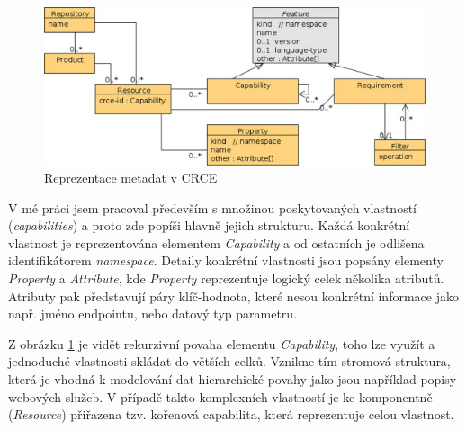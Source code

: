 \documentclass[czech,DP]{thesiskiv}
\begin{document}
 \begin{figure}[h]
 	\centering
 	\includegraphics{resource-uml}
 	\caption{Reprezentace metadat v CRCE}
 	\label{fig:crce-resource-uml}
 \end{figure}

V mé práci jsem pracoval především s množinou poskytovaných vlastností (\textit{capabilities}) a proto zde popíši hlavně jejich strukturu. Každá konkrétní vlastnost je reprezentována elementem \textit{Capability} a od ostatních je odlišena identifikátorem \textit{namespace}. Detaily konkrétní vlastnosti jsou popsány elementy \textit{Property} a \textit{Attribute}, kde \textit{Property} reprezentuje logický celek několika atributů. Atributy pak představují páry klíč-hodnota, které nesou konkrétní informace jako např. jméno endpointu, nebo datový typ parametru.

Z obrázku \ref{fig:crce-resource-uml} je vidět rekurzivní povaha elementu \textit{Capability}, toho lze využít a jednoduché vlastnosti skládat do větších celků. Vznikne tím stromová struktura, která je vhodná k modelování dat hierarchické povahy jako jsou například popisy webových služeb. V případě takto komplexních vlastností je ke komponentně (\textit{Resource}) přiřazena tzv. kořenová capabilita, která reprezentuje celou vlastnost.

\end{document}

